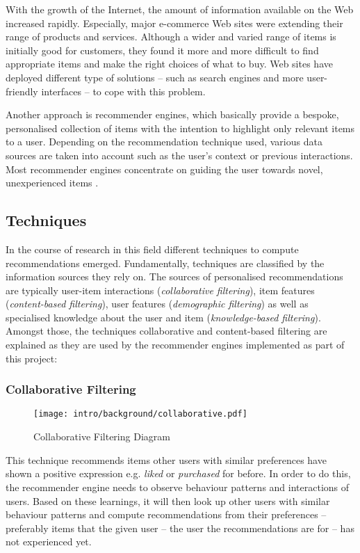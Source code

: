 With the growth of the Internet, the amount of information available on the Web increased rapidly. Especially, major e-commerce Web sites were extending their range of products and services. Although a wider and varied range of items is initially good for customers, they found it more and more difficult to find appropriate items and make the right choices of what to buy. Web sites have deployed different type of solutions -- such as search engines and more user-friendly interfaces -- to cope with this problem.

Another approach is recommender engines, which basically provide a bespoke, personalised collection of items with the intention to highlight only relevant items to a user. Depending on the recommendation technique used, various data sources are taken into account such as the user's context or previous interactions. Most recommender engines concentrate on guiding the user towards novel, unexperienced items \cite{herlocker04}.

\subsection{Techniques}

In the course of research in this field different techniques to compute recommendations emerged. Fundamentally, techniques are classified by the information sources they rely on. The sources of personalised recommendations are typically user-item interactions (\emph{collaborative filtering}), item features (\emph{content-based filtering}), user features (\emph{demographic filtering}) as well as specialised knowledge about the user and item (\emph{knowledge-based filtering}).  Amongst those, the techniques collaborative and content-based filtering are explained as they are used by the recommender engines implemented as part of this project:

\subsubsection{Collaborative Filtering}
\label{intro-bg-tech-collaborative}

\begin{figure}[ht]
    \texttt{[image: intro/background/collaborative.pdf]}
    \caption{Collaborative Filtering Diagram}
    \label{fig:intro-techniques-collaborative}
\end{figure}

This technique recommends items other users with similar preferences have shown a positive expression e.g. \emph{liked} or \emph{purchased} for before. In order to do this, the recommender engine needs to observe behaviour patterns and interactions of users. Based on these learnings, it will then look up other users with similar behaviour patterns and compute recommendations from their preferences -- preferably items that the given user -- the user the recommendations are for -- has not experienced yet.

